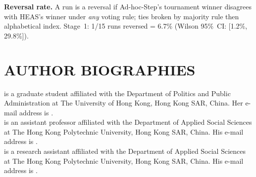\documentclass{wscpaperproc}
\begin{document}
\textbf{Reversal rate.} A run is a reversal if Ad-hoc-Step's tournament
winner disagrees with HEAS's winner under \emph{any} voting rule; ties
broken by majority rule then alphabetical index. Stage~1: 1/15 runs
reversed = 6.7\% (Wilson 95\%~CI: [1.2\%, 29.8\%]).

\begingroup
\small


\endgroup

\section*{AUTHOR BIOGRAPHIES}

 is a graduate student affiliated with the Department of Politics and Public Administration at The University of Hong Kong, Hong Kong SAR, China. Her e-mail address is .\\

 is an assistant professor affiliated with the Department of Applied Social Sciences at The Hong Kong Polytechnic University, Hong Kong SAR, China. His e-mail address is .\\

 is a research assistant affiliated with the Department of Applied Social Sciences at The Hong Kong Polytechnic University, Hong Kong SAR, China. His e-mail address is .
\end{document}
